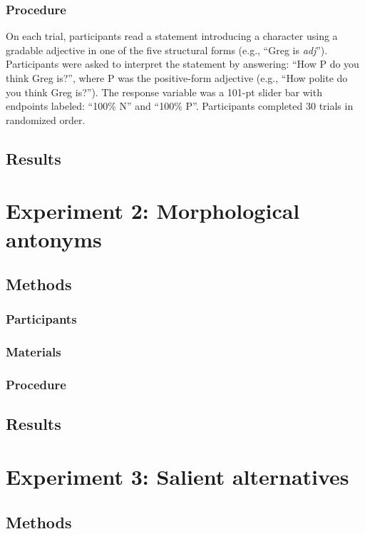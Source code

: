 \documentclass[10pt,letterpaper]{article}
\begin{document}
\subsubsection{Procedure}

On each trial, participants read a statement introducing a character using a gradable adjective in one of the five structural forms (e.g., ``Greg is \emph{adj}'').
Participants were asked to interpret the statement by answering: ``How P do you think Greg is?'', where P was the positive-form adjective (e.g., ``How polite do you think Greg is?'').
The response variable was a 101-pt slider bar with endpoints labeled: ``100\% N'' and ``100\% P''.
Participants completed 30 trials in randomized order.

\subsection{Results}

\section{Experiment 2: Morphological antonyms}


\subsection{Methods}
\subsubsection{Participants}
\subsubsection{Materials}
\subsubsection{Procedure}
\subsection{Results}


\section{Experiment 3: Salient alternatives}

\subsection{Methods}
\end{document}

